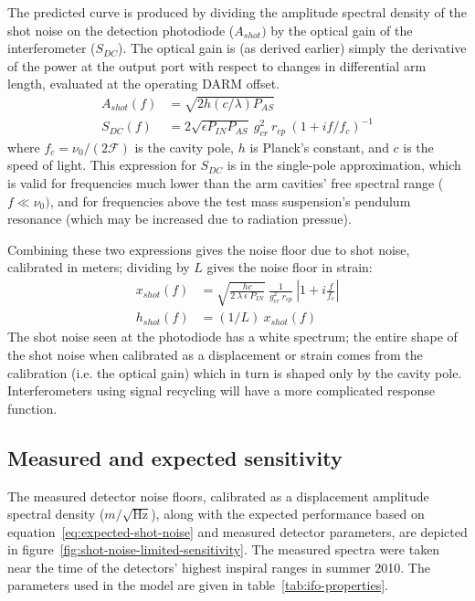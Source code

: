 The predicted curve is produced by dividing the amplitude spectral density of
the shot noise on the detection photodiode ($A_{shot})$ by the optical gain of
the interferometer ($S_{DC}$). The optical gain is (as derived earlier) simply
the derivative of the power at the output port with respect to changes in
differential arm length, evaluated at the operating DARM offset.
%
\begin{align}
A_{shot}(f) &= \sqrt{2 h (c/\lambda) P_{AS}} \\
S_{DC}(f) &= 2 \sqrt{\epsilon P_{IN} P_{AS}}\ g_{cr}^2\ r_{cp}\ \left(1 + i f/f_c\right)^{-1}
\end{align}
%
where $f_c = \nu_0 / (2\mathcal{F})$ is the cavity pole, $h$ is Planck's
constant, and $c$ is the speed of light.  This expression for $S_{DC}$ is in the single-pole
approximation, which is valid for frequencies much lower than the arm cavities'
free spectral range ($f\ll \nu_0)$, and for frequencies above the test mass
suspension's pendulum resonance (which may be increased due to radiation
pressue).

Combining these two expressions gives the noise floor due to shot noise,
calibrated in meters; dividing by $L$ gives the noise floor in strain:
%
\begin{align}
x_{shot}(f) & = \sqrt{\frac{h c}{2\ \lambda\ \epsilon\ P_{IN}}}\ \frac{1}{g_{cr}^2\ r_{cp}}
\ \left|1 + i \frac{f}{f_c}\right| \\
h_{shot}(f) &= (1/L)\ x_{shot}(f)
\label{eq:expected-shot-noise}
\end{align}
%
The shot noise seen at the photodiode has a white spectrum; the entire shape of
the shot noise when calibrated as a displacement or strain comes from the
calibration (i.e. the optical gain) which in turn is shaped only by the cavity
pole.  Interferometers using signal recycling will have a more complicated
response function.

\subsection{Measured and expected sensitivity}
The measured detector noise floors, calibrated as a displacement amplitude
spectral density ($m/\sqrt{\text{Hz}}$), along with the expected performance
based on equation~\ref{eq:expected-shot-noise} and measured detector parameters,
are depicted in figure~\ref{fig:shot-noise-limited-sensitivity}.  The measured
spectra were taken near the time of the detectors' highest inspiral ranges in
summer 2010.  The parameters used in the model are given in
table~\ref{tab:ifo-properties}.  


